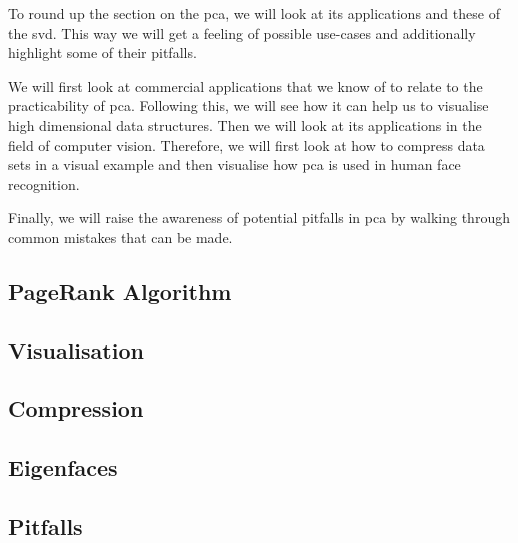 To round up the section on the \acrlong{pca}, we will look at its applications and these of the \acrlong{svd}.
This way we will get a feeling of possible use-cases and additionally highlight some of their pitfalls.

We will first look at commercial applications that we know of to relate to the practicability of \gls{pca}.
Following this, we will see how it can help us to visualise high dimensional data structures.
Then we will look at its applications in the field of computer vision.
Therefore, we will first look at how to compress data sets in a visual example and then visualise how \gls{pca} is used in human face recognition.

Finally, we will raise the awareness of potential pitfalls in \gls{pca} by walking through common mistakes that can be made.


\subsection{PageRank Algorithm}

\clearpage

\subsection{Visualisation}

\clearpage

\subsection{Compression}

\clearpage

\subsection{Eigenfaces} \label{sec:eigenfaces}

\clearpage

\subsection{Pitfalls}

\clearpage
